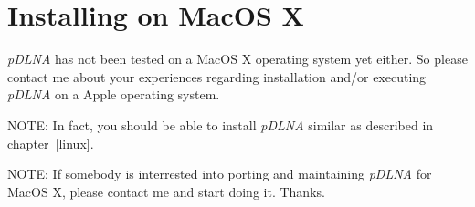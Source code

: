 %
%

\chapter{Installing on MacOS X}
\label{install-macosx}

{\em pDLNA} has not been tested on a MacOS X operating system yet either. So please contact me about your experiences regarding installation and/or executing {\em pDLNA} on a Apple operating system.

\begin{colframenote}
\textsc{NOTE:} In fact, you should be able to install {\em pDLNA} similar as described in chapter~\ref{linux}.
\end{colframenote}

\begin{colframenote}
\textsc{NOTE:} If somebody is interrested into porting and maintaining {\em pDLNA} for MacOS X, please contact me and start doing it. Thanks.
\end{colframenote}
